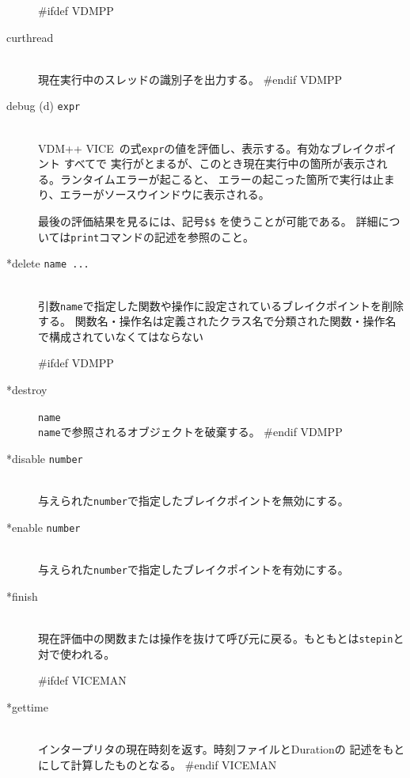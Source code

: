 \documentclass[\pformat,12pt]{article}
\newcommand{\vdmslpp}{VDM-SL}
\newcommand{\vdmslpp}{VDM++}
\renewcommand{\vdmslpp}{VDM++ VICE}
\begin{document}
\begin{description}
#ifdef VDMPP
\item[curthread]\mbox{}\\
  現在実行中のスレッドの識別子を出力する。
#endif VDMPP

\item[debug (d) {\tt expr}]  \mbox{}\\
  \vdmslpp\ の式{\tt expr}の値を評価し、表示する。有効なブレイクポイント すべてで
  実行がとまるが、このとき現在実行中の箇所が表示される。ランタイムエラーが起こると、
  エラーの起こった箇所で実行は止まり、エラーがソースウインドウに表示される。
  
  最後の評価結果を見るには、記号{\tt \$\$}\index{\$\$} を使うことが可能である。
  詳細については{\tt print}コマンドの記述を参照のこと。
    
\item[*delete {\tt name ...}] \mbox{}\\
    引数{\tt name}で指定した関数や操作に設定されているブレイクポイントを削除する。
    {%
        関数名・操作名は定義されたクラス名で分類された関数・操作名で構成されていなくてはならない
    }%
    {}%
    
#ifdef VDMPP
\item[*destroy] {\tt name}\mbox{}\\
  {\tt name}で参照されるオブジェクトを破棄する。
#endif VDMPP

\item[*disable \texttt{number}]
\mbox{}\\
  与えられた{\tt number}で指定したブレイクポイントを無効にする。

\item[*enable \texttt{number}]
\mbox{}\\
  与えられた{\tt number}で指定したブレイクポイントを有効にする。

\item[*finish]\mbox{}\\
  現在評価中の関数または操作を抜けて呼び元に戻る。もともとは{\tt stepin}と対で使われる。

#ifdef VICEMAN
\item[*gettime]\mbox{}\\
  インタープリタの現在時刻を返す。時刻ファイルとDurationの
  記述をもとにして計算したものとなる。
#endif VICEMAN


\end{description}
\end{document}
